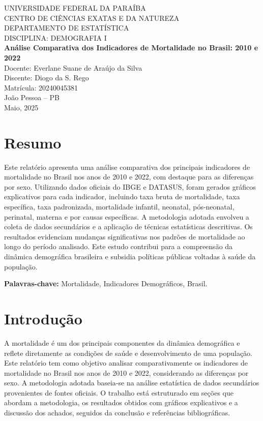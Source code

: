 \documentclass[12pt]{article}
\begin{document}
\begin{titlepage}
    \centering
    {\Large UNIVERSIDADE FEDERAL DA PARAÍBA\\}
    {\large CENTRO DE CIÊNCIAS EXATAS E DA NATUREZA\\}
    {\large DEPARTAMENTO DE ESTATÍSTICA\\}
    {\large DISCIPLINA: DEMOGRAFIA I\\[2cm]}
    {\Huge \textbf{Análise Comparativa dos Indicadores de Mortalidade no Brasil: 2010 e 2022}\\[2cm]}
    {\large Docente: Everlane Suane de Araújo da Silva\\}
    {\large Discente: Diogo da S. Rego\\}
    {\large Matrícula: 20240045381\\[2cm]}
    {\large João Pessoa – PB\\}
    {\large Maio, 2025\\}
\end{titlepage}

\section*{Resumo}
Este relatório apresenta uma análise comparativa dos principais indicadores de mortalidade no Brasil nos anos de 2010 e 2022, com destaque para as diferenças por sexo. Utilizando dados oficiais do IBGE e DATASUS, foram gerados gráficos explicativos para cada indicador, incluindo taxa bruta de mortalidade, taxa específica, taxa padronizada, mortalidade infantil, neonatal, pós-neonatal, perinatal, materna e por causas específicas. A metodologia adotada envolveu a coleta de dados secundários e a aplicação de técnicas estatísticas descritivas. Os resultados evidenciam mudanças significativas nos padrões de mortalidade ao longo do período analisado. Este estudo contribui para a compreensão da dinâmica demográfica brasileira e subsidia políticas públicas voltadas à saúde da população.

\textbf{Palavras-chave:} Mortalidade, Indicadores Demográficos, Brasil.

\section{Introdução}
A mortalidade é um dos principais componentes da dinâmica demográfica e reflete diretamente as condições de saúde e desenvolvimento de uma população. Este relatório tem como objetivo analisar comparativamente os indicadores de mortalidade no Brasil nos anos de 2010 e 2022, considerando as diferenças por sexo. A metodologia adotada baseia-se na análise estatística de dados secundários provenientes de fontes oficiais. O trabalho está estruturado em seções que abordam a metodologia, os resultados obtidos com gráficos explicativos e a discussão dos achados, seguidos da conclusão e referências bibliográficas.
\end{document}

